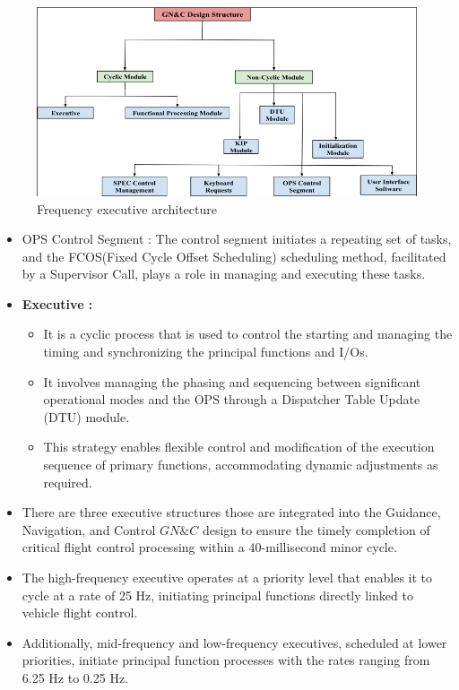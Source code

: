 \documentclass[a4paper,11pt]{article}%
\newenvironment{qanda}{\setlength{\parindent}{0pt}}{\bigskip}
\begin{document}
\begin{qanda}
\begin{enumerate}
\begin{enumerate}
				 
				      \begin{figure}[H]
					      \centering
					      \includegraphics[scale=0.7]{figures/fea.png}
					      \caption{Frequency executive architecture}
				      \end{figure}

				      \begin{itemize}
					      \item OPS Control Segment : The control segment initiates a repeating set of tasks, and the FCOS(Fixed Cycle
					            Offset Scheduling) scheduling method, facilitated by a Supervisor Call, plays a role in managing and executing
					            these tasks.
					      \item \textbf{Executive :}
					            \begin{itemize}
						            \item It is a cyclic process that is used to control the starting and managing the timing and synchronizing the	principal functions and I/Os.
						            \item It involves managing the phasing and sequencing between significant operational modes and the OPS
						                  through a Dispatcher Table Update (DTU) module.
						            \item This strategy enables flexible control and modification of the execution sequence of primary functions, accommodating dynamic adjustments as required.

					            \end{itemize}

					      \item There are three executive structures those are integrated into the Guidance, Navigation, and Control \(GN\&C\) design to ensure the timely completion of critical flight control processing within a 40-millisecond minor cycle.
					      \item The high-frequency executive operates at a priority level that enables it to cycle at a rate of 25 Hz, initiating	principal functions directly linked to vehicle flight control.
					      \item Additionally, mid-frequency and low-frequency executives, scheduled at lower priorities, initiate principal function processes with the rates ranging from 6.25 Hz to 0.25 Hz.
				      \end{itemize}


\end{enumerate}
\end{enumerate}
\end{qanda}
\end{document}
